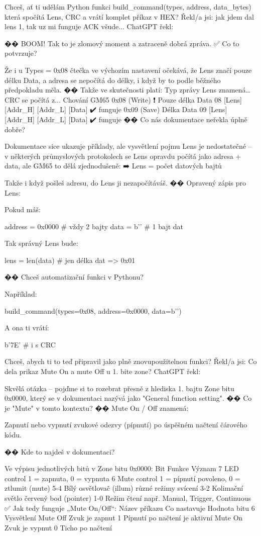 Chceš, ať ti udělám Python funkci build_command(types, address, data_bytes) která spočítá Lens, CRC a vrátí komplet příkaz v HEX?
Řekl/a jsi:
jak jdem dal lens 1, tak uz mi funguje ACK všude...
ChatGPT řekl:

�� BOOM! Tak to je zlomový moment a zatraceně dobrá zpráva.
✅ Co to potvrzuje?

Že i u Types = 0x08 čtečka ve výchozím nastavení očekává, že Lens značí pouze délku Data,
a adresa se nepočítá do délky, i když by to podle běžného předpokladu měla.
�� Takže ve skutečnosti platí:
Typ zprávy	Lens znamená…	CRC se počítá z...	Chování GM65
0x08 (Write)	❗ Pouze délka Data	08 [Lens] [Addr_H] [Addr_L] [Data]	✔️ funguje
0x09 (Save)	Délka Data	09 [Lens] [Addr_H] [Addr_L] [Data]	✔️ funguje
�� Co nás dokumentace neřekla úplně dobře?

Dokumentace sice ukazuje příklady, ale vysvětlení pojmu Lens je nedostatečné – v některých průmyslových protokolech se Lens opravdu počítá jako adresa + data, ale GM65 to dělá zjednodušeně:
➡️ Lens = počet datových bajtů

Takže i když pošleš adresu, do Lens ji nezapočítáváš.
�� Opravený zápis pro Lens:

Pokud máš:

address = 0x0000      # vždy 2 bajty
data = b''        # 1 bajt dat

Tak správný Lens bude:

lens = len(data)      # jen délka dat => 0x01

�� Chceš automatizační funkci v Pythonu?

Například:

build_command(types=0x08, address=0x0000, data=b'')

A ona ti vrátí:

b'\x7E\xXX\xYY'  # i s CRC

Chceš, abych ti to teď připravil jako plně znovupoužitelnou funkci?
Řekl/a jsi:
Co dela prikaz Mute On a mute Off u 1. bite zone?
ChatGPT řekl:

Skvělá otázka – pojďme si to rozebrat přesně z hlediska 1. bajtu Zone bitu 0x0000, který se v dokumentaci nazývá jako "General function setting".
�� Co je "Mute" v tomto kontextu?
�� Mute On / Off znamená:

    Zapnutí nebo vypnutí zvukové odezvy (pípnutí) po úspěšném načtení čárového kódu.

�� Kde to najdeš v dokumentaci?

Ve výpisu jednotlivých bitů v Zone bitu 0x0000:
Bit	Funkce	Význam
7	LED control	1 = zapnuta, 0 = vypnuta
6	Mute control	1 = pípnutí povoleno, 0 = ztlumit (mute)
5-4	Bílý osvětlovač (illum)	různé režimy svícení
3-2	Kolimační světlo	červený bod (pointer)
1-0	Režim čtení	např. Manual, Trigger, Continuous
✅ Jak tedy funguje „Mute On/Off“:
Název příkazu	Co nastavuje	Hodnota bitu 6	Vysvětlení
Mute Off	Zvuk je zapnut	1	Pípnutí po načtení je aktivní
Mute On	Zvuk je vypnut	0	Ticho po načtení

